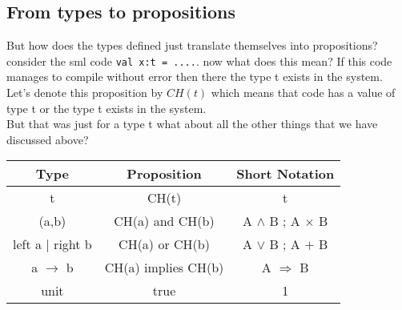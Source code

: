 \documentclass{article}
\begin{document}
\subsection{From types to propositions}
But how does the types defined just translate themselves into propositions?\\
consider the sml code \verb|val x:t = ....|. now what does this mean? If this code manages to compile without error then
there the type t exists in the system.\\
Let's denote this proposition by $CH \left( t \right) $ which means that code has a value of type t or the type t exists in the
system.\\
But that was just for a type t what about all the other things that we have discussed above?

\begingroup
\setlength{\tabcolsep}{10pt} %
\renewcommand{\arraystretch}{1.5} %
\begin{tabular}{c c c}
  Type & Proposition & Short Notation \\
  \hline
  t   & CH(t) & t \\
  \hline
  (a,b) & CH(a) and CH(b) & A $\wedge$ B ; A $\times$ B\\
  \hline
  left a $\mid$ right b & CH(a) or CH(b) & A $\vee$ B ; A $+$ B\\
  \hline
  a $\to$ b & CH(a) implies CH(b) & A $\Longrightarrow$ B\\
  \hline
  unit & true & 1
\end{tabular}
\endgroup                
\end{document}
